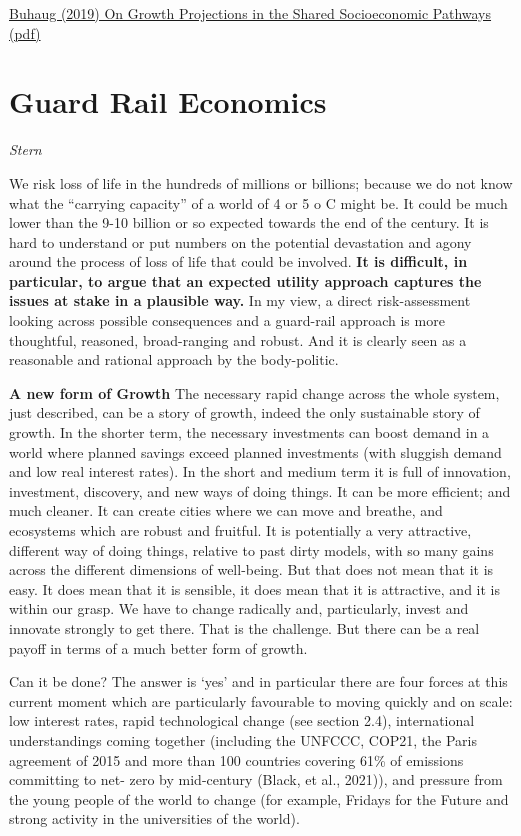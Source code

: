 \documentclass[
]{book}
\begin{document}
\href{https://direct.mit.edu/glep/article/19/4/118/14961/On-Growth-Projections-in-the-Shared-Socioeconomic}{Buhaug (2019) On Growth Projections in the Shared Socioeconomic Pathways}
\href{pdf/Buhaug_2019_SSPs.pdf}{(pdf)}

\hypertarget{guard-rail-economics}{%
\section{Guard Rail Economics}\label{guard-rail-economics}}

\emph{Stern}

We risk loss of life in the hundreds of millions or billions; because we do not know what the ``carrying
capacity'' of a world of 4 or 5 o C might be. It could be much lower than the 9-10 billion or so expected
towards the end of the century. It is hard to understand or put numbers on the potential devastation and
agony around the process of loss of life that could be involved.
\textbf{It is difficult, in particular, to argue that
an expected utility approach captures the issues at stake in a plausible way.}
In my view, a direct risk-assessment looking across possible consequences
and a guard-rail approach is more thoughtful,
reasoned, broad-ranging and robust.
And it is clearly seen as a reasonable and rational approach by
the body-politic.

\textbf{A new form of Growth}
The necessary rapid change across the whole system, just described, can be a story of growth, indeed
the only sustainable story of growth. In the shorter term, the necessary investments can boost demand
in a world where planned savings exceed planned investments (with sluggish demand and low real
interest rates). In the short and medium term it is full of innovation, investment, discovery, and new
ways of doing things. It can be more efficient; and much cleaner. It can create cities where we can move
and breathe, and ecosystems which are robust and fruitful. It is potentially a very attractive, different
way of doing things, relative to past dirty models, with so many gains across the different dimensions
of well-being. But that does not mean that it is easy. It does mean that it is sensible, it does mean that
it is attractive, and it is within our grasp. We have to change radically and, particularly, invest and
innovate strongly to get there. That is the challenge. But there can be a real payoff in terms of a much
better form of growth.

Can it be done? The answer is `yes' and in particular there are four forces at this current moment which
are particularly favourable to moving quickly and on scale: low interest rates, rapid technological change
(see section 2.4), international understandings coming together (including the UNFCCC, COP21, the
Paris agreement of 2015 and more than 100 countries covering 61\% of emissions committing to net-
zero by mid-century (Black, et al., 2021)), and pressure from the young people of the world to change
(for example, Fridays for the Future and strong activity in the universities of the world).
\end{document}
